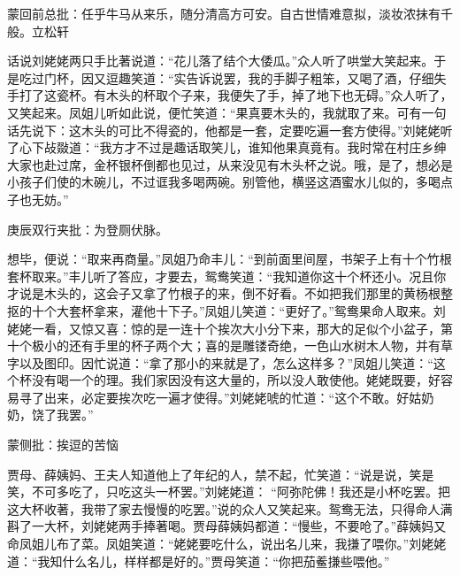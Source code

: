 
\begin{parag}

    \begin{note}蒙回前总批：任乎牛马从来乐，随分清高方可安。自古世情难意拟，淡妆浓抹有千般。立松轩\end{note}
\end{parag}

\begin{parag}

    话说刘姥姥两只手比著说道：“花儿落了结个大倭瓜。”众人听了哄堂大笑起来。于是吃过门杯，因又逗趣笑道：“实告诉说罢，我的手脚子粗笨，又喝了酒，仔细失手打了这瓷杯。有木头的杯取个子来，我便失了手，掉了地下也无碍。”众人听了，又笑起来。凤姐儿听如此说，便忙笑道：“果真要木头的，我就取了来。可有一句话先说下：这木头的可比不得瓷的，他都是一套，定要吃遍一套方使得。”刘姥姥听了心下敁敠道：“我方才不过是趣话取笑儿，谁知他果真竟有。我时常在村庄乡绅大家也赴过席，金杯银杯倒都也见过，从来没见有木头杯之说。哦，是了，想必是小孩子们使的木碗儿，不过诓我多喝两碗。别管他，横竖这酒蜜水儿似的，多喝点子也无妨。”\begin{note}庚辰双行夹批：为登厕伏脉。\end{note}想毕，便说：“取来再商量。”凤姐乃命丰儿：“到前面里间屋，书架子上有十个竹根套杯取来。”丰儿听了答应，才要去，鸳鸯笑道：“我知道你这十个杯还小。况且你才说是木头的，这会子又拿了竹根子的来，倒不好看。不如把我们那里的黄杨根整抠的十个大套杯拿来，灌他十下子。”凤姐儿笑道：“更好了。”鸳鸯果命人取来。刘姥姥一看，又惊又喜：惊的是一连十个挨次大小分下来，那大的足似个小盆子，第十个极小的还有手里的杯子两个大；喜的是雕镂奇绝，一色山水树木人物，并有草字以及图印。因忙说道：“拿了那小的来就是了，怎么这样多？”凤姐儿笑道：“这个杯没有喝一个的理。我们家因没有这大量的，所以没人敢使他。姥姥既要，好容易寻了出来，必定要挨次吃一遍才使得。”刘姥姥唬的忙道：“这个不敢。好姑奶奶，饶了我罢。”\begin{note}蒙侧批：挨逗的苦恼\end{note}贾母、薛姨妈、王夫人知道他上了年纪的人，禁不起，忙笑道：“说是说，笑是笑，不可多吃了，只吃这头一杯罢。”刘姥姥道： “阿弥陀佛！我还是小杯吃罢。把这大杯收著，我带了家去慢慢的吃罢。”说的众人又笑起来。鸳鸯无法，只得命人满斟了一大杯，刘姥姥两手捧著喝。贾母薛姨妈都道：“慢些，不要呛了。”薛姨妈又命凤姐儿布了菜。凤姐笑道：“姥姥要吃什么，说出名儿来，我搛了喂你。”刘姥姥道：“我知什么名儿，样样都是好的。”贾母笑道：“你把茄鲝搛些喂他。” 
\end{parag}
